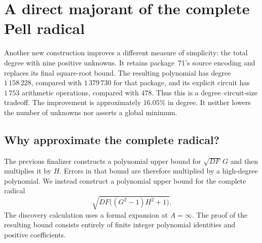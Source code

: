 \section{A direct majorant of the complete Pell radical}
\label{sec:directmajorant}

Another new construction improves a different measure of simplicity:
the total degree with nine positive unknowns.  It retains package~71's
source encoding and replaces its final square-root bound.  The resulting
polynomial has degree $1\,158\,228$, compared with $1\,379\,730$ for that
package, and its explicit circuit has $1\,753$ arithmetic operations,
compared with $478$.  Thus this is a degree--circuit-size tradeoff.
The improvement is approximately $16.05\%$ in degree.  It neither lowers
the number of unknowns nor asserts a global minimum.

\subsection{Why approximate the complete radical?}

The previous finalizer constructs a polynomial upper bound for
$\sqrt{DF}\,G$ and then multiplies it by $H$.  Errors in that bound are
therefore multiplied by a high-degree polynomial.  We instead construct
a polynomial upper bound for the complete radical
\[
 \sqrt{DF\bigl((G^2-1)H^2+1\bigr)}.
\]
The discovery calculation uses a formal expansion at $A=\infty$.
The proof of the resulting bound consists entirely of finite integer
polynomial identities and positive coefficients.

